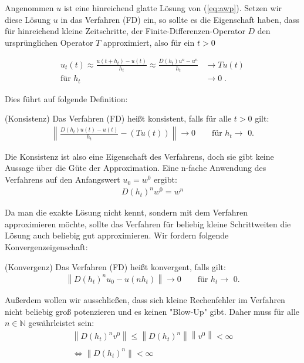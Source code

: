 Angenommen $u$ ist eine hinreichend glatte Lösung von (\ref{eq:awp}). 
Setzen wir diese Lösung $u$ in das Verfahren (FD) ein, so sollte es die Eigenschaft haben, dass für hinreichend kleine Zeitschritte, der Finite-Differenzen-Operator $D$ den ursprünglichen Operator $T$ approximiert, also für ein $t >0$

\begin{align}
    u_t(t) \approx \frac{u(t+h_t) - u(t)}{h_t} \approx \frac{D(h_t) u^n - u^n}{h_t} &\longrightarrow Tu(t) \nonumber \\
    \text{für } h_t &\longrightarrow 0 \; .
\end{align}

Dies führt auf folgende Definition:

\begin{definition}(Konsistenz)
    Das Verfahren (FD) heißt konsistent, falls für alle $t>0$ gilt:
    \begin{align}
        \left\| \frac{D(h_t)u(t) - u(t)}{h_t} - (Tu(t)) \right\| \longrightarrow 0 \qquad \text{für $h_t \longrightarrow$ 0.}
    \end{align}
\end{definition}

Die Konsistenz ist also eine Eigenschaft des Verfahrens, doch sie gibt keine Aussage über die Güte der Approximation. Eine n-fache Anwendung des Verfahrens auf den Anfangswert $u_0 = w^0$ ergibt: \begin{align}
    D(h_t)^n w^0 = w^{n}
\end{align}

Da man die exakte Lösung nicht kennt, sondern mit dem Verfahren approximieren möchte, sollte das Verfahren für beliebig kleine Schrittweiten die Lösung auch beliebig gut approximieren. Wir fordern folgende Konvergenzeigenschaft:

\begin{definition}(Konvergenz)
    Das Verfahren (FD) heißt konvergent, falls gilt:
    \begin{align}
        \left\| D(h_t)^n u_0 - u(n h_t) \right\| \longrightarrow 0 \qquad \text{für $h_t \longrightarrow$ 0.}
    \end{align}
\end{definition}

Außerdem wollen wir ausschließen, dass sich kleine Rechenfehler im Verfahren nicht beliebig groß potenzieren und es keinen "Blow-Up" gibt. Daher muss für alle $n\in \mathbb{N}$ gewährleistet sein:
\begin{align}
    \left\| D(h_t)^n v^0  \right\| \le \left\| D(h_t)^n \right\| \left\| v^0  \right\| < \infty \nonumber \\ \nonumber \\
    \Leftrightarrow \| D(h_t)^n \| < \infty 
\end{align}

